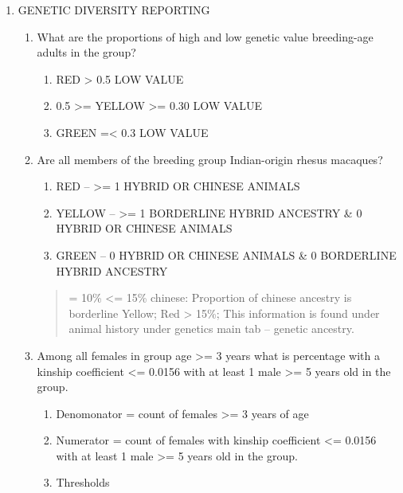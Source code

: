 \documentclass[
]{article}
\providecommand{\tightlist}{%
  \setlength{\itemsep}{0pt}\setlength{\parskip}{0pt}}
\begin{document}
\begin{enumerate}
\def\labelenumi{\arabic{enumi}.}
\tightlist
\item
  GENETIC DIVERSITY REPORTING

  \begin{enumerate}
  \def\labelenumii{\arabic{enumii}.}
  \tightlist
  \item
    What are the proportions of high and low genetic value breeding-age
    adults in the group?

    \begin{enumerate}
    \def\labelenumiii{\arabic{enumiii}.}
    \tightlist
    \item
      RED \textgreater{} 0.5 LOW VALUE
    \item
      0.5 \textgreater= YELLOW \textgreater= 0.30 LOW VALUE
    \item
      GREEN =\textless{} 0.3 LOW VALUE
    \end{enumerate}
  \item
    Are all members of the breeding group Indian-origin rhesus macaques?

    \begin{enumerate}
    \def\labelenumiii{\arabic{enumiii}.}
    \tightlist
    \item
      RED -- \textgreater= 1 HYBRID OR CHINESE ANIMALS
    \item
      YELLOW -- \textgreater= 1 BORDERLINE HYBRID ANCESTRY \& 0 HYBRID
      OR CHINESE ANIMALS
    \item
      GREEN -- 0 HYBRID OR CHINESE ANIMALS \& 0 BORDERLINE HYBRID
      ANCESTRY
    \end{enumerate}

    \begin{quote}
    = 10\% \textless= 15\% chinese: Proportion of chinese ancestry is
    borderline Yellow; Red \textgreater{} 15\%; This information is
    found under animal history under genetics main tab -- genetic
    ancestry.
    \end{quote}
  \item
    Among all females in group age \textgreater= 3 years what is
    percentage with a kinship coefficient \textless= 0.0156 with at
    least 1 male \textgreater= 5 years old in the group.

    \begin{enumerate}
    \def\labelenumiii{\arabic{enumiii}.}
    \tightlist
    \item
      Denomonator = count of females \textgreater= 3 years of age
    \item
      Numerator = count of females with kinship coefficient \textless=
      0.0156 with at least 1 male \textgreater= 5 years old in the
      group.
    \item
      Thresholds


\end{enumerate}
\end{enumerate}
\end{enumerate}
\end{document}

